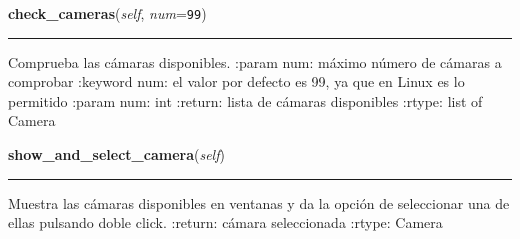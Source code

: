     \label{src:cameras:Cameras:check_cameras}

    \vspace{0.5ex}

\hspace{.8\funcindent}\begin{boxedminipage}{\funcwidth}

    \raggedright \textbf{check\_cameras}(\textit{self}, \textit{num}={\tt 99})

    \vspace{-1.5ex}

    \rule{\textwidth}{0.5\fboxrule}
\setlength{\parskip}{2ex}
    Comprueba las cámaras disponibles. :param num: máximo número de cámaras
    a comprobar :keyword num: el valor por defecto es 99, ya que en Linux 
    es lo permitido :param num: int :return: lista de cámaras disponibles 
    :rtype: list of Camera

\setlength{\parskip}{1ex}
    \end{boxedminipage}

    \label{src:cameras:Cameras:show_and_select_camera}

    \vspace{0.5ex}

\hspace{.8\funcindent}\begin{boxedminipage}{\funcwidth}

    \raggedright \textbf{show\_and\_select\_camera}(\textit{self})

    \vspace{-1.5ex}

    \rule{\textwidth}{0.5\fboxrule}
\setlength{\parskip}{2ex}
    Muestra las cámaras disponibles en ventanas y da la opción de 
    seleccionar una de ellas pulsando doble click. :return: cámara 
    seleccionada :rtype: Camera

\setlength{\parskip}{1ex}
    \end{boxedminipage}

